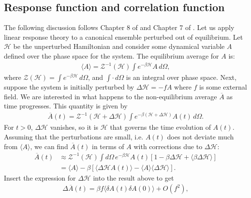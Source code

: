 \documentclass[prl,
twocolumn,
nofootinbib,
amsmath,amssymb,
aps]{revtex4-1}
\newcommand{\be}{\beta}
\newcommand{\f}[2]{\frac{#1}{#2}}
\newcommand{\lb}{\left[}
\newcommand{\rb}{\right]}
\begin{document}
\subsection{Response function and correlation function}
The following discussion follows  Chapter 8 of \cite{chandler1988introduction} and Chapter 7 of \cite{chaikin1995principles}. Let us apply linear response theory to a canonical ensemble perturbed out of equilibrium. Let $\mathcal{H}$ be the unperturbed Hamiltonian and consider some dynamical variable $A$ defined over the phase space for the system. The equilibrium average for $A$ is:
\begin{align*}
\langle A \rangle =  \mathcal{Z}^{-1}(\mathcal{H}) \int e^{-\be \mathcal{H}} A\, d\Omega,
\end{align*}
where $\mathcal{Z}(\mathcal{H}) = \int e^{-\be \mathcal{H}} \, d\Omega$, and $\int \cdot \,d\Omega$ is an integral over phase space. Next, suppose the system is initially perturbed by $\Delta \mathcal{H} = -f A$ where $f$ is some external field. We are interested in what happens to the non-equilibrium average $\overline{A}$ as time progresses. This quantity is given by 
\begin{align*}
\overline{A}(t) = \mathcal{Z}^{-1}(\mathcal{H} + \Delta \mathcal{H})  \int e^{-\be(\mathcal{H} + \Delta \mathcal{H})} A(t) \, d\Omega. 
\end{align*}
For $t>0$, $\Delta \mathcal{H}$ vanishes, so it is $\mathcal{H}$ that governs the time evolution of $A(t)$. Assuming that the perturbations are small, i.e. $A(t)$ does not deviate much from $\langle A \rangle$, we can find $\overline{A}(t)$ in terms of $A$ with corrections due to $\Delta \mathcal{H}$:
\begin{align*}
\overline{A}(t) 
&\approx \mathcal{Z}^{-1}(\mathcal{H})  \int d\Omega \, e^{-\be \mathcal{H}} A(t)   \lb 1 - \be \Delta \mathcal{H}  + \langle  \be \Delta \mathcal{H}  \rangle  \rb \\ 
&= \langle A \rangle - \be \lb \langle \Delta \mathcal{H} A(t) \rangle - \langle A \rangle \langle \Delta \mathcal{H} \rangle  \rb.
\end{align*}
Insert the expression for $\Delta \mathcal{H}$ into the result above to get
\begin{align}
\label{eq:fluctuation}
\Delta \overline{A}(t) = \be f \langle \delta A(t) \delta A(0) \rangle + {O}(f^2),
\end{align}
\end{document}
